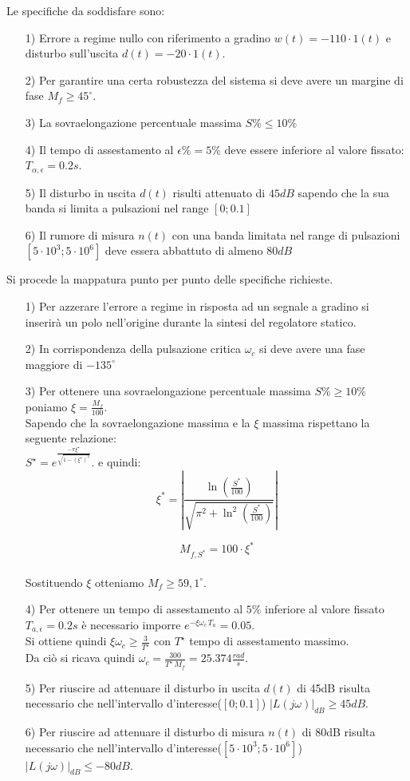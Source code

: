 \documentclass[a4paper, 11pt]{article}
\begin{document}
Le specifiche da soddisfare sono:
\begin{itemize}
	\item[1)] Errore a regime nullo con riferimento a gradino $w(t)=-110\cdot1(t)$ e disturbo sull'uscita $d(t)=-20\cdot1(t)$.\label{spec1}
	\item[2)] Per garantire una certa robustezza del sistema si deve avere un margine di fase $M_f\ge45^{\circ}$.\label{spec2}
	\item[3)] La sovraelongazione percentuale massima $S\%\le10\%$\label{spec3}
	\item[4)] Il tempo di assestamento al $\epsilon \% = 5\%$ deve essere inferiore al valore fissato: $T_{\alpha,\epsilon}=0.2s$.\label{spec4}
	\item[5)] Il disturbo in uscita $d(t)$ risulti attenuato di $45dB$ sapendo che la sua banda si limita a pulsazioni nel range $[0;0.1]$\label{spec5}
	\item[6)] Il rumore di misura $n(t)$ con una banda limitata nel range di pulsazioni $[5\cdot10^3;5\cdot10^6]$ deve essera abbattuto di almeno $80dB$ \label{spec6}
\end{itemize}
%
Si procede la mappatura punto per punto delle specifiche richieste. 
\begin{itemize}
	\item[1)] Per azzerare l'errore a regime in risposta ad un segnale a gradino si inserirà un polo nell'origine durante la sintesi del regolatore statico.\
	\item[2)] In corrispondenza della pulsazione critica $\omega_c$ si deve avere una fase maggiore di $-135^{\circ}$\
	\item[3)] Per ottenere una sovraelongazione percentuale massima $S\%\ge10\%$ poniamo $\xi=\frac{M_f}{100}$.
	\\
	Sapendo che la sovraelongazione massima e la $\xi$ massima rispettano la seguente relazione:\\
	 $S^\star=e^\frac{-\pi\xi^\star}{\sqrt{1-(\xi^\star)^2}}$. e quindi: \\
     \[
        \xi^* = \left| \frac{\ln{\left(\frac{S^*}{100}\right)}}{\sqrt{\pi^2 + \ln^2{\left(\frac{S^*}{100}\right)}}} \right|
        \]
        
        \[
        M_{f,S^*} = 100 \cdot \xi^*
        \]
	 \\
	 Sostituendo $\xi$ otteniamo $M_f\ge59,1^{\circ}$.
	\item[4)] Per ottenere un tempo di assestamento al $5\%$ inferiore al valore fissato  $T_{a,\epsilon}=0.2s$ è necessario imporre $e^{-\xi\omega_c\,T_a}=0.05$.\\
	Si ottiene quindi $\xi\omega_c\ge\frac{3}{T^\star}$ con $T^\star$ tempo di assestamento massimo.\\
	Da ciò si ricava quindi $\omega_c=\frac{300}{T^\star\,M_f}=25.374\frac{rad}{s}$.
	\item[5)] Per riuscire ad attenuare il disturbo in uscita $d(t)$ di 45dB risulta necessario che nell'intervallo d'interesse($[0;0.1]$) $|L(j\omega)|_{dB}\ge45dB$.\
	\item[6)] Per riuscire ad attenuare il disturbo di misura $n(t)$ di 80dB risulta necessario che nell'intervallo d'interesse($[5\cdot10^3;5\cdot10^6]$) $|L(j\omega)|_{dB}\le-80dB$.\
\end{itemize}
\end{document}
